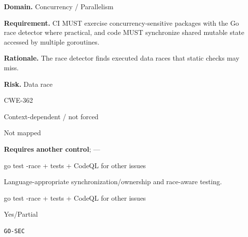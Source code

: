 \documentclass[10pt,letterpaper]{article}
\newcommand{\prioritybadge}[2]{\tcbox[on line,boxrule=0pt,arc=1.2mm,boxsep=0.7mm,left=1mm,right=1mm,top=0.4mm,bottom=0.4mm,colback=#2!12,coltext=#2]{\scriptsize\bfseries #1}}
\begin{document}
\begin{rulebox}[title={\texttt{SCS-GO-CONC-001} \hfill \prioritybadge{High Priority}{High}}]
\textbf{Domain.} Concurrency / Parallelism

\textbf{Requirement.} CI MUST exercise concurrency-sensitive packages with the Go race detector where practical, and code MUST synchronize shared mutable state accessed by multiple goroutines.

\textbf{Rationale.} The race detector finds executed data races that static checks may miss.

\textbf{Risk.} Data race

\begin{description}[leftmargin=2.65cm,labelwidth=2.3cm,style=nextline,itemsep=1pt,topsep=3pt]
  \item[CWE] CWE-362
  \item[OWASP] Context-dependent / not forced
  \item[CERT] Not mapped
  \item[CodeQL] \textbf{Requires another control}; ---
  \item[Enforcement] go test -race + tests + CodeQL for other issues
  \item[Prevention] Language-appropriate synchronization/ownership and race-aware testing.
  \item[Verification] go test -race + tests + CodeQL for other issues
  \item[Automation] Yes/Partial
  \item[Sources] \texttt{GO-SEC}
\end{description}
\end{rulebox}
\end{document}
